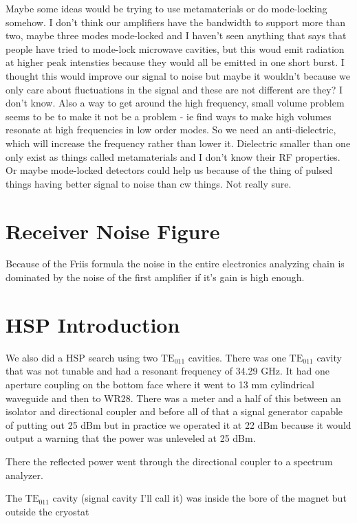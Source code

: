 \documentclass[11pt]{article}
\begin{document}
Maybe some ideas would be trying to use metamaterials or do mode-locking somehow. I don't think our amplifiers have the bandwidth to support more than two, maybe three modes mode-locked and I haven't seen anything that says that people have tried to mode-lock microwave cavities, but this woud emit radiation at higher peak intensties because they would all be emitted in one short burst. I thought this would improve our 
signal to noise but maybe it wouldn't because we only care about fluctuations in the signal and these are not different are they? I don't know.
Also a way to get around the high frequency, small volume problem seems to be to make it not be a problem - ie find ways to make high volumes resonate at high frequencies in low order modes. So we need an anti-dielectric, which will increase the frequency rather than lower it. Dielectric smaller than one only exist as things called metamaterials and I don't know their RF properties.
Or maybe mode-locked detectors could help us because of the thing of pulsed things having better signal to noise than cw things. Not really sure.


\section{Receiver Noise Figure}

Because of the Friis formula the noise in the entire electronics analyzing chain is dominated by the noise of the first amplifier if it's gain is high enough.

\section{HSP Introduction}

We also did a HSP search using two $\text{TE}_{011}$ cavities. There was one $\text{TE}_{011}$ cavity that was not tunable and had a resonant frequency of 34.29 GHz. It had one aperture coupling on the bottom face where it went to 13 mm cylindrical waveguide and then to WR28. There was a meter and a half of this between an isolator and directional coupler and before all of that a signal generator capable of putting out 25 dBm but in practice we operated it at 22 dBm because it would output a warning that the power was unleveled at 25 dBm. 

There the reflected power went through the directional coupler to a spectrum analyzer.

The $\text{TE}_{011}$ cavity (signal cavity I’ll call it) was inside the bore of the magnet but outside the cryostat
\end{document}
